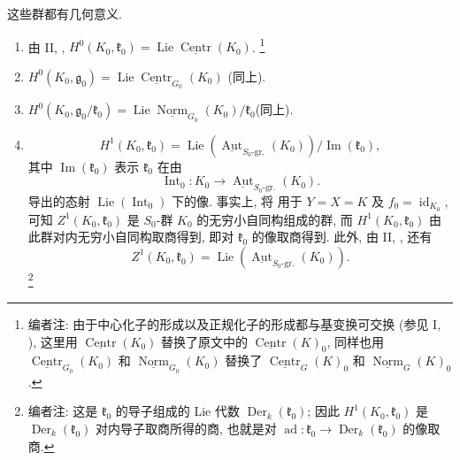 这些群都有几何意义.

\begin{enumerate}
\item[\textbf{a)}]
由 II, ,
\(H^0(K_0,\mathfrak k_0)
=\operatorname{Lie}\underline{\operatorname{Centr}}(K_0)\).
\footnote{编者注: 由于中心化子的形成以及正规化子的形成都与基变换可交换
(参见 I, ),
这里用 \(\underline{\operatorname{Centr}}(K_0)\) 替换了原文中的
\(\underline{\operatorname{Centr}}(K)_0\),
同样也用 \(\underline{\operatorname{Centr}}_{G_0}(K_0)\) 和
\(\underline{\operatorname{Norm}}_{G_0}(K_0)\) 替换了
\(\underline{\operatorname{Centr}}_G(K)_0\) 和
\(\underline{\operatorname{Norm}}_G(K)_0\).}

\item[\textbf{b)}]
\(H^0(K_0,\mathfrak g_0)
=\operatorname{Lie}\underline{\operatorname{Centr}}_{G_0}(K_0)\)
\footnotemark[138] (同上).

\item[\textbf{c)}]
\(H^0(K_0,\mathfrak g_0/\mathfrak k_0)
=\operatorname{Lie}\underline{\operatorname{Norm}}_{G_0}(K_0)
/\mathfrak k_0\)\footnotemark[138] (同上).

\item[\textbf{d)}]
\[
 H^1(K_0,\mathfrak k_0)
 =\operatorname{Lie}\!\left(
   \underline{\operatorname{Aut}}_{S_0\text{-gr.}}(K_0)
  \right)/\operatorname{Im}(\mathfrak k_0),
\]
其中 \(\operatorname{Im}(\mathfrak k_0)\) 表示 \(\mathfrak k_0\)
在由
\[
 \operatorname{Int}_0:K_0\longrightarrow
 \underline{\operatorname{Aut}}_{S_0\text{-gr.}}(K_0).
\]
导出的态射 \(\operatorname{Lie}(\operatorname{Int}_0)\) 下的像.
事实上, 将  用于 \(Y=X=K\)
及 \(f_0=\operatorname{id}_{K_0}\), 可知 \(Z^1(K_0,\mathfrak k_0)\)
是 \(S_0\)-群 \(K_0\) 的无穷小自同构组成的群,
而 \(H^1(K_0,\mathfrak k_0)\) 由此群对内无穷小自同构取商得到,
即对 \(\mathfrak k_0\) 的像取商得到. 此外, 由 II,
, 还有
\[
 Z^1(K_0,\mathfrak k_0)
 =\operatorname{Lie}\!\left(
   \underline{\operatorname{Aut}}_{S_0\text{-gr.}}(K_0)
  \right).
\]
\footnote{编者注: 这是 \(\mathfrak k_0\) 的导子组成的 Lie 代数
\(\operatorname{Der}_k(\mathfrak k_0)\);
因此 \(H^1(K_0,\mathfrak k_0)\) 是
\(\operatorname{Der}_k(\mathfrak k_0)\) 对内导子取商所得的商,
也就是对 \(\operatorname{ad}:\mathfrak k_0\to\operatorname{Der}_k(\mathfrak k_0)\)
的像取商.}


\end{enumerate}
